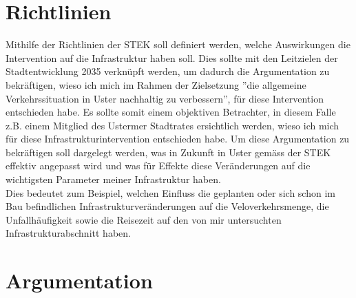 \documentclass[
  paper=a4,                         %
  fontsize=11pt,                    %
  DIV=12,                           %
  BCOR=10mm,                        %
  twoside=true,                     %
  parskip=half,                     %
  headings=small,                   %
 ]{scrartcl}
\begin{document}

\section{ \large Richtlinien}
Mithilfe der Richtlinien der STEK soll definiert werden, welche Auswirkungen die Intervention auf die Infrastruktur haben soll. Dies sollte mit den Leitzielen der Stadtentwicklung 2035 verknüpft werden, um dadurch die Argumentation zu bekräftigen, wieso ich mich im Rahmen der Zielsetzung ''die allgemeine Verkehrssituation in Uster nachhaltig zu verbessern'', für diese Intervention entschieden habe. Es sollte somit einem objektiven Betrachter, in diesem Falle z.B. einem Mitglied des Ustermer Stadtrates ersichtlich werden, wieso ich mich für diese Infrastrukturintervention entschieden habe.
Um diese Argumentation zu bekräftigen soll dargelegt werden, was in Zukunft in Uster gemäss der STEK effektiv angepasst wird und was für Effekte diese Veränderungen auf die wichtigsten Parameter meiner Infrastruktur haben. \\
Dies bedeutet zum Beispiel, welchen Einfluss die geplanten oder sich schon im Bau befindlichen Infrastrukturveränderungen auf die Veloverkehrsmenge, die Unfallhäufigkeit sowie die Reisezeit auf den von mir untersuchten Infrastrukturabschnitt haben.



\section{\large Argumentation}
\end{document}

